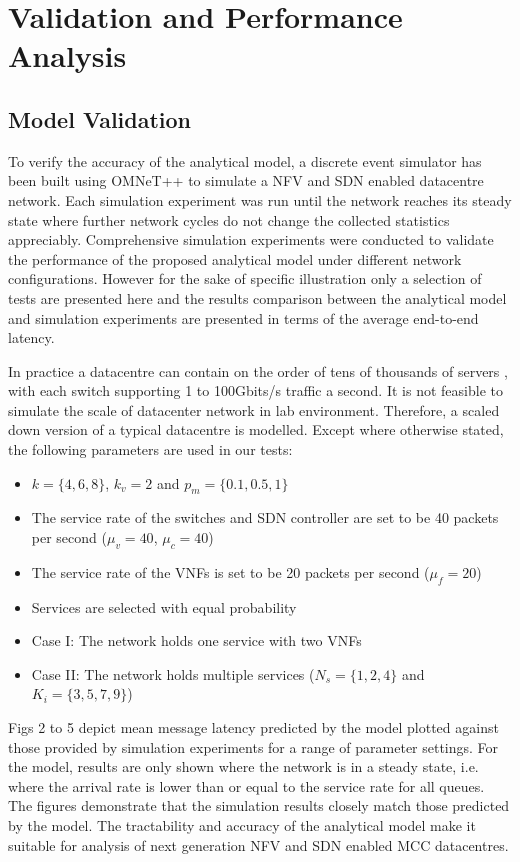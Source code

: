 \section{Validation and Performance Analysis}
\label{sec:validation}

\subsection{Model Validation}

To verify the accuracy of the analytical model, a discrete event simulator has been built using OMNeT++ \cite{VargaH08} to simulate a NFV and SDN enabled datacentre network. Each simulation experiment was run until the network reaches its steady state where further network cycles do not change the collected statistics appreciably. Comprehensive simulation experiments were conducted to validate the performance of the proposed analytical model under different network configurations. However for the sake of specific illustration only a selection of tests are presented here and the results comparison between the analytical model and simulation experiments are presented in terms of the average end-to-end latency.

In practice a datacentre can contain on the order of tens of thousands of servers \cite{AWS16}, with each switch supporting 1 to 100Gbits/s traffic a second. It is not feasible to simulate the scale of datacenter network in lab environment. Therefore, a scaled down version of a typical datacentre is modelled. Except where otherwise stated, the following parameters are used in our tests:

\begin{itemize}
	\item $k = \{4, 6, 8\}$, $k_{v} = 2$ and $p_{m} = \{0.1, 0.5, 1\}$
	\item The service rate of the switches and SDN controller are set to be 40 packets per second ($\mu_{v} = 40$, $\mu_{c} = 40$)
	\item The service rate of the VNFs is set to be 20 packets per second ($\mu_{f} = 20$)
	\item Services are selected with equal probability
	\item Case I: The network holds one service with two VNFs
	\item Case II: The network holds multiple services ($N_s = \{1,2,4\}$ and $K_i=\{3,5,7,9\}$)
\end{itemize}

Figs 2 to 5 depict mean message latency predicted by the model plotted against those provided by simulation experiments for a range of parameter settings. For the model, results are only shown where the network is in a steady state, i.e. where the arrival rate is lower than or equal to the service rate for all queues. The figures demonstrate that the simulation results closely match those predicted by the model. The tractability and accuracy of the analytical model make it suitable for analysis of next generation NFV and SDN enabled MCC datacentres.

